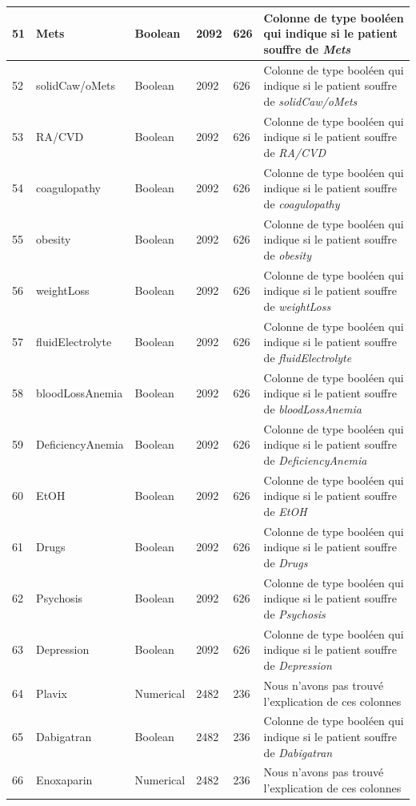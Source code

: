 \documentclass[12pt, french]{report}
\begin{document}
\begin{longtable}{| p{} | p{} | p{} | p{}  | p{} | p{} |  }
51 &	Mets & Boolean & 2092 & 626& Colonne de type booléen qui indique si le patient souffre  de \textit{Mets} \\ \hline 
52 &	solidCaw/oMets & Boolean & 2092 & 626& Colonne de type booléen qui indique si le patient souffre  de \textit{solidCaw/oMets} \\ \hline 
53 &	RA/CVD & Boolean & 2092 & 626& Colonne de type booléen qui indique si le patient souffre  de \textit{RA/CVD} \\ \hline 
54 &	coagulopathy & Boolean & 2092 & 626& Colonne de type booléen qui indique si le patient souffre  de \textit{coagulopathy} \\ \hline 
55 &	obesity & Boolean & 2092 & 626& Colonne de type booléen qui indique si le patient souffre  de \textit{obesity} \\ \hline 
56 &	weightLoss & Boolean & 2092 & 626& Colonne de type booléen qui indique si le patient souffre  de \textit{weightLoss} \\ \hline 
57 &	fluidElectrolyte & Boolean & 2092 & 626& Colonne de type booléen qui indique si le patient souffre  de \textit{fluidElectrolyte} \\ \hline 
58 &	bloodLossAnemia & Boolean & 2092 & 626& Colonne de type booléen qui indique si le patient souffre  de \textit{bloodLossAnemia} \\ \hline 
59 &	DeficiencyAnemia & Boolean & 2092 & 626& Colonne de type booléen qui indique si le patient souffre  de \textit{DeficiencyAnemia} \\ \hline 
60 &	EtOH & Boolean & 2092 & 626& Colonne de type booléen qui indique si le patient souffre  de \textit{EtOH} \\ \hline 
61 &	Drugs & Boolean & 2092 & 626& Colonne de type booléen qui indique si le patient souffre  de \textit{Drugs} \\ \hline 
62 &	Psychosis & Boolean & 2092 & 626& Colonne de type booléen qui indique si le patient souffre  de \textit{Psychosis} \\ \hline 
63 &	Depression & Boolean & 2092 & 626& Colonne de type booléen qui indique si le patient souffre  de \textit{Depression} \\ \hline 
64 &	Plavix & Numerical & 2482 & 236 & Nous n’avons pas trouvé l’explication de ces colonnes \\ \hline 
65 &	Dabigatran & Boolean & 2482 & 236& Colonne de type booléen qui indique si le patient souffre  de \textit{Dabigatran} \\ \hline 
66 &	Enoxaparin & Numerical & 2482 & 236 & Nous n’avons pas trouvé l’explication de ces colonnes \\ \hline 

\end{longtable}
\end{document}
